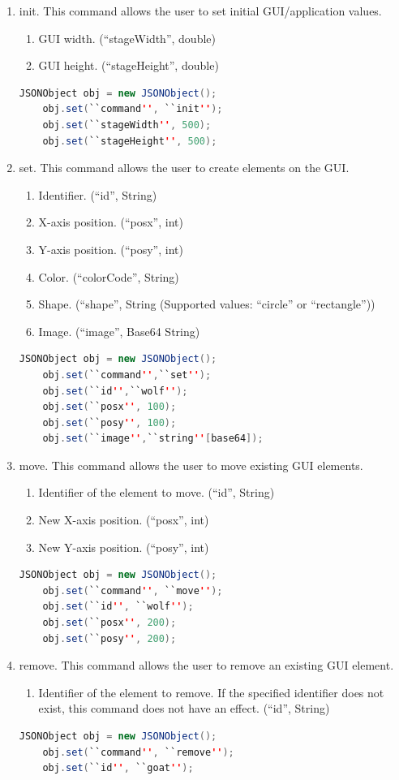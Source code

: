 \documentclass[11pt,a4paper]{article}
\begin{document}
\begin{enumerate}
	\item init. This command allows the user to set initial GUI/application values.
		\begin{enumerate}
			\item GUI width. (``stageWidth'', double)
			\item GUI height. (``stageHeight'', double)
		\end{enumerate}
	\begin{lstlisting}[language=java]
	JSONObject obj = new JSONObject();
	obj.set(``command'', ``init'');
	obj.set(``stageWidth'', 500);
	obj.set(``stageHeight'', 500);
	\end{lstlisting}
	\item set. This command allows the user to create elements on the GUI.
		\begin{enumerate}
			\item Identifier. (``id'', String)
			\item X-axis position. (``posx'', int)
			\item Y-axis position. (``posy'', int)
			\item Color. (``colorCode'', String)
			\item Shape. (``shape'', String (Supported values: ``circle'' or ``rectangle''))
			\item Image. (``image'', Base64 String)
		\end{enumerate}
	\begin{lstlisting}[language=java]
	JSONObject obj = new JSONObject();
	obj.set(``command'',``set'');
	obj.set(``id'',``wolf'');
	obj.set(``posx'', 100);
	obj.set(``posy'', 100);
	obj.set(``image'',``string''[base64]);
	\end{lstlisting}
	\item move. This command allows the user to move existing GUI elements.
		\begin{enumerate}
			\item Identifier of the element to move. (``id'', String)
			\item New X-axis position. (``posx'', int)
			\item New Y-axis position. (``posy'', int)
		\end{enumerate}
	\begin{lstlisting}[language=java]
	JSONObject obj = new JSONObject();
	obj.set(``command'', ``move'');
	obj.set(``id'', ``wolf'');
	obj.set(``posx'', 200);
	obj.set(``posy'', 200);
	\end{lstlisting}
	\item remove. This command allows the user to remove an existing GUI element.
		\begin{enumerate}
			\item Identifier of the element to remove. If the specified identifier does not exist, this command does not have an effect. (``id'', String)
		\end{enumerate}
	\begin{lstlisting}[language=java]
	JSONObject obj = new JSONObject();
	obj.set(``command'', ``remove'');
	obj.set(``id'', ``goat'');
	\end{lstlisting}
\end{enumerate}
\end{document}
